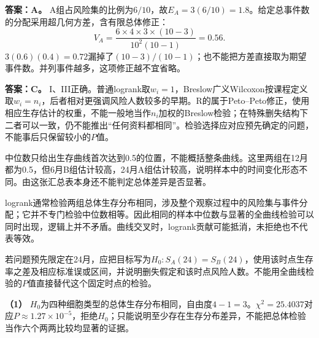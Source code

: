 \par\noindent\begin{minipage}{\linewidth}
\textbf{答案：A。} A组占风险集的比例为$6/10$，故$E_A=3(6/10)=1.8$。给定总事件数的分配采用超几何方差，含有限总体修正：
\[
V_A=\frac{6\times4\times3\times(10-3)}
{10^2(10-1)}=0.56.
\]
$3(0.6)(0.4)=0.72$漏掉了$(10-3)/(10-1)$；也不能把方差直接取为期望事件数。并列事件越多，这项修正越不宜省略。
\par\nobreak\smallskip{}
\end{minipage}\par\medskip

\textbf{答案：C。} I、III正确。普通logrank取$w_i=1$，Breslow广义Wilcoxon按课程定义取$w_i=n_i$，后者相对更强调风险人数较多的早期。R的属于Peto--Peto修正，使用相应生存估计的权重，不能一般地当作$n_i$加权的Breslow检验；在特殊删失结构下二者可以一致，仍不能推出“任何资料都相同”。检验选择应对应预先确定的问题，不能事后只保留较小的$P$值。
\par\nobreak\smallskip{}

中位数只给出生存曲线首次达到0.5的位置，不能概括整条曲线。这里两组在12月都为0.5，但6月B组估计较高，24月A组估计较高，说明样本中的时间变化形态不同。由这张汇总表本身还不能判定总体差异是否显著。

logrank通常检验两组总体生存分布相同，涉及整个观察过程中的风险集与事件分配；它并不专门检验中位数相等。因此相同的样本中位数与显著的全曲线检验可以同时出现，逻辑上并不矛盾。曲线交叉时，logrank贡献可能抵消，未拒绝也不代表等效。

若问题预先限定在24月，应把目标写为$H_0:S_A(24)=S_B(24)$，使用该时点生存率之差及相应标准误或区间，并说明删失假定和该时点风险人数。不能用全曲线检验的$P$值直接替代这个固定时点的检验。
\par\nobreak\smallskip{}

\textbf{（1）} $H_0$为四种细胞类型的总体生存分布相同，自由度$4-1=3$。$\chi^2=25.4037$对应$P\approx1.27\times10^{-5}$，拒绝$H_0$；只能说明至少存在生存分布差异，不能把总体检验当作六个两两比较均显著的证据。

